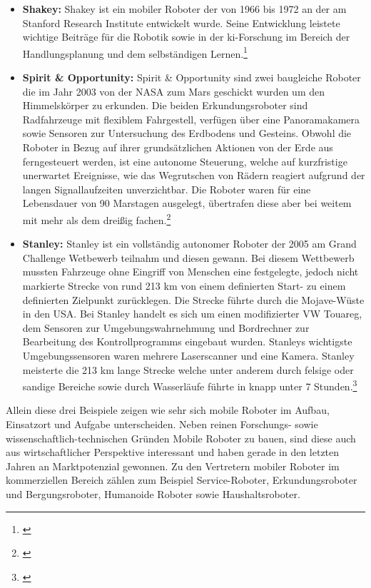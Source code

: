 \begin{itemize}
	\item{\textbf{Shakey:}} Shakey ist ein mobiler Roboter der von 1966 bis 1972 an der am Stanford Research Institute entwickelt wurde. Seine Entwicklung leistete wichtige Beiträge für die Robotik sowie in der \gls{ki}-Forschung im Bereich der Handlungsplanung und dem selbständigen Lernen.\footnote{\citep[vgl.][Mobile Roboter, Seite 5 f.]{Hertzberg.MobileRoboter}\label{note4}}
	\item{\textbf{Spirit \& Opportunity:}} Spirit \& Opportunity sind zwei baugleiche Roboter die im Jahr 2003 von der NASA zum Mars geschickt wurden um den Himmelskörper zu erkunden. Die beiden Erkundungsroboter sind Radfahrzeuge mit flexiblem Fahrgestell, verfügen über eine Panoramakamera sowie Sensoren zur Untersuchung des Erdbodens und Gesteins. Obwohl die Roboter in Bezug auf ihrer grundsätzlichen Aktionen von der Erde aus ferngesteuert werden, ist eine autonome Steuerung, welche auf kurzfristige unerwartet Ereignisse, wie das Wegrutschen von Rädern reagiert aufgrund der langen Signallaufzeiten unverzichtbar. Die Roboter waren für eine
	Lebensdauer von 90 Marstagen ausgelegt, übertrafen diese aber bei weitem mit mehr als dem dreißig fachen.\footnote{\citep[vgl.][Mobile Roboter, Seite 8 f.]{Hertzberg.MobileRoboter}\label{note4}}
	\item{\textbf{Stanley:}} Stanley ist ein vollständig autonomer Roboter der 2005 am Grand Challenge Wetbewerb teilnahm und diesen gewann. Bei diesem Wettbewerb mussten Fahrzeuge ohne Eingriff von Menschen eine festgelegte, jedoch nicht markierte Strecke von rund 213 km von einem definierten Start- zu einem definierten Zielpunkt zurücklegen. Die Strecke führte durch die Mojave-Wüste in den USA. Bei Stanley handelt es sich um einen modifizierter VW Touareg, dem Sensoren zur Umgebungswahrnehmung und Bordrechner zur Bearbeitung des Kontrollprogramms eingebaut wurden. Stanleys wichtigste Umgebungssensoren waren mehrere Laserscanner und eine Kamera. Stanley meisterte die 213 km lange Strecke welche unter anderem durch felsige oder sandige Bereiche sowie durch Wasserläufe führte in knapp unter 7 Stunden.\footnote{\citep[vgl.][Mobile Roboter, Seite 9 f.]{Hertzberg.MobileRoboter}\label{note5}}
\end{itemize}
Allein diese drei Beispiele zeigen wie sehr sich mobile Roboter im Aufbau, Einsatzort und Aufgabe unterscheiden. Neben reinen Forschungs- sowie wissenschaftlich-technischen Gründen Mobile Roboter zu bauen, sind diese auch aus wirtschaftlicher Perspektive interessant und haben gerade in den letzten Jahren an Marktpotenzial gewonnen.
\newline
Zu den Vertretern mobiler Roboter im kommerziellen Bereich zählen zum Beispiel Service-Roboter, Erkundungsroboter und Bergungsroboter, Humanoide Roboter sowie Haushaltsroboter.
